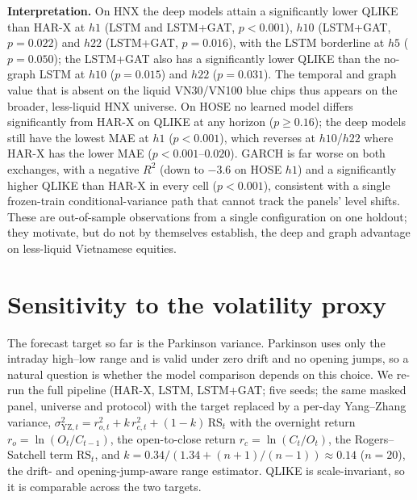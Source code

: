 \documentclass[runningheads]{llncs}
\begin{document}
\textbf{Interpretation.} On HNX the deep models attain a significantly lower QLIKE than HAR-X at $h1$
(LSTM and LSTM+GAT, $p<0.001$), $h10$ (LSTM+GAT, $p=0.022$) and $h22$ (LSTM+GAT, $p=0.016$), with the LSTM
borderline at $h5$ ($p=0.050$); the LSTM+GAT also has a significantly lower QLIKE than the no-graph LSTM at
$h10$ ($p=0.015$) and $h22$ ($p=0.031$). The temporal and graph value that is absent on the liquid VN30/VN100
blue chips thus appears on the broader, less-liquid HNX universe. On HOSE no learned model differs
significantly from HAR-X on QLIKE at any horizon ($p\ge0.16$); the deep models still have the lowest MAE at
$h1$ ($p<0.001$), which reverses at $h10$/$h22$ where HAR-X has the lower MAE ($p<0.001$--$0.020$). GARCH is
far worse on both exchanges, with a negative $R^2$ (down to $-3.6$ on HOSE $h1$) and a significantly
higher QLIKE than HAR-X in every cell ($p<0.001$), consistent with a single frozen-train conditional-variance
path that cannot track the panels' level shifts.
These are out-of-sample observations from a single configuration on one holdout; they motivate, but do not by
themselves establish, the deep and graph advantage on less-liquid Vietnamese equities.

\section{Sensitivity to the volatility proxy}\label{sec:proxy}
The forecast target so far is the Parkinson variance. Parkinson uses only the intraday high--low range and is
valid under zero drift and no opening jumps, so a natural question is whether the model comparison depends on
this choice. We re-run the full pipeline (HAR-X, LSTM, LSTM+GAT; five seeds; the same masked panel, universe and
protocol) with the target replaced by a per-day Yang--Zhang variance,
$\sigma^2_{\mathrm{YZ},t}=r_{o,t}^2+k\,r_{c,t}^2+(1-k)\,\mathrm{RS}_t$ with the overnight return
$r_o=\ln(O_t/C_{t-1})$, the open-to-close return $r_c=\ln(C_t/O_t)$, the Rogers--Satchell term $\mathrm{RS}_t$,
and $k=0.34/(1.34+(n{+}1)/(n{-}1))\approx0.14$ ($n{=}20$), the drift- and opening-jump-aware range estimator.
QLIKE is scale-invariant, so it is comparable across the two targets.
\end{document}

